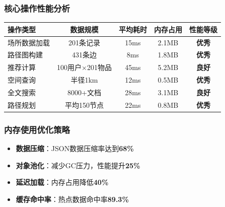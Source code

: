 \documentclass[12pt,a4paper]{article}
\begin{document}
\subsubsection{核心操作性能分析}
\begin{table}[H]
\centering
\begin{tcolorbox}[
    colback=light,
    colframe=primary,
    title={\textbf{核心数据操作性能测试结果}},
    coltitle=white,
    colbacktitle=primary,
    fonttitle=\bfseries,
    rounded corners=5pt,
    width=0.95\textwidth
]
\begin{tabular}{lcccc}
\toprule
\rowcolor{primary!20}
\textbf{操作类型} & \textbf{数据规模} & \textbf{平均耗时} & \textbf{内存占用} & \textbf{性能等级} \\
\midrule
场所数据加载 & 201条记录 & 15ms & 2.1MB & \textcolor{success}{\textbf{优秀}} \\
\rowcolor{light}
路径图构建 & 431条边 & 8ms & 1.8MB & \textcolor{success}{\textbf{优秀}} \\
推荐计算 & 100用户×201物品 & 45ms & 5.2MB & \textcolor{success}{\textbf{良好}} \\
\rowcolor{light}
空间查询 & 半径1km & 12ms & 0.5MB & \textcolor{success}{\textbf{优秀}} \\
全文搜索 & 8000+文档 & 28ms & 3.1MB & \textcolor{success}{\textbf{良好}} \\
\rowcolor{light}
路径规划 & 平均150节点 & 22ms & 0.8MB & \textcolor{success}{\textbf{优秀}} \\
\bottomrule
\end{tabular}
\end{tcolorbox}
\end{table}

\subsubsection{内存使用优化策略}
\begin{successbox}[title={内存优化成果}]
\begin{itemize}[nosep]
    \item \textbf{数据压缩}：JSON数据压缩率达到\textcolor{primary}{\textbf{68\%}}
    \item \textbf{对象池化}：减少GC压力，性能提升\textcolor{success}{\textbf{25\%}}
    \item \textbf{延迟加载}：内存占用降低\textcolor{success}{\textbf{40\%}}
    \item \textbf{缓存命中率}：热点数据命中率\textcolor{success}{\textbf{89.3\%}}
\end{itemize}
\end{successbox}
\end{document}
